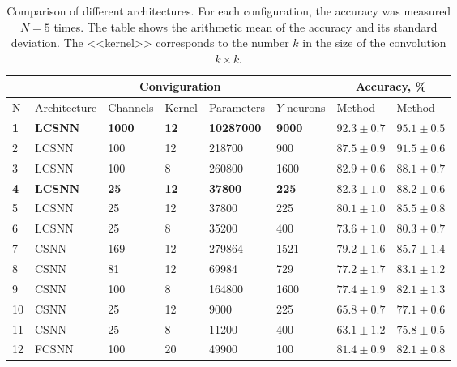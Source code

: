 \documentclass[a4paper,10pt]{article}
\begin{document}
\begin{table}
 \caption{Comparison of different architectures. For each configuration, the accuracy was measured $ N = 5 $ times. The table shows the arithmetic mean of the accuracy and its standard deviation. The <<kernel>> corresponds to the number $ k $ in the size of the convolution $ k \times k $.}
\begin{center}
\begin{adjustwidth}{-1cm}{}
\begin{tabular}{|l|l|l|l|l|l|p{2.2cm}|p{2.2cm}|}
\hline
&\multicolumn{5}{c|}{Conviguration} & \multicolumn{2}{c|}{Accuracy, \%}\\
\hline
N & Architecture & Channels & Kernel & Parameters & $Y$ neurons & {Method \footnotemark[1]} & {Method \footnotemark[2]} \\
\hline\hline
{\textbf{1}} & {\textbf{LCSNN}} & {\textbf{1000}} & {\textbf{12}} & {\textbf{10287000}} & {\textbf{9000}} & {$\mathbf{92.3 \pm 0.7}$} & {$\mathbf{95.1 \pm 0.5}$}\\
\hline
2 & {LCSNN} & {100} & {12} & {218700} & {900} & {$87.5 \pm 0.9$} & {$91.5 \pm 0.6$}\\
\hline
3 & {LCSNN} & {100} & {8} & {260800} & {1600} & {$82.9 \pm 0.6$} & {$88.1 \pm 0.7$}\\
\hline
{\textbf{4}} & {\textbf{LCSNN\footnotemark[3]}} & {\textbf{25}} & {\textbf{12}} & {\textbf{37800}} & {\textbf{225}} & {$\mathbf{82.3 \pm 1.0}$} & {$\mathbf{88.2 \pm 0.6}$}\\
\hline
5 & {LCSNN} & {25} & {12} & {37800} & {225} & {$80.1 \pm 1.0$} & {$85.5 \pm 0.8$}\\
\hline
6 & {LCSNN} & {25} & {8} & {35200} & {400} & {$73.6 \pm 1.0$} & {$80.3 \pm 0.7$}\\
\hline\hline
7 & {CSNN} & {169} & {12} & {279864} & {1521} & {$79.2 \pm 1.6$} & {$85.7 \pm 1.4$}\\
\hline
8 & {CSNN} & {81} & {12} & {69984} & {729} & {$77.2 \pm 1.7$} & {$83.1 \pm 1.2$}\\
\hline
9 & {CSNN} & {100} & {8} & {164800} & {1600} & {$77.4 \pm 1.9$} & {$82.1 \pm 1.3$}\\
\hline
10 & {CSNN} & {25} & {12} & {9000} & {225} & {$65.8 \pm 0.7$} & {$77.1 \pm 0.6$}\\
\hline
11 & {CSNN} & {25} & {8} & {11200} & {400} & {$63.1 \pm 1.2$} & {$75.8 \pm 0.5$}\\
\hline\hline
12 & {FCSNN} & {100} & {20} & {49900} & {100} & {$81.4 \pm 0.9$} & {$82.1 \pm 0.8$}\\
\hline
\end{tabular}
\end{adjustwidth}
\end{center}
 \label{results}
\end{table}
\end{document}
